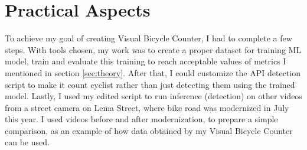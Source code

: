 \chapter{Practical Aspects}
\label{cha:practicalAspects}

To achieve my goal of creating Visual Bicycle Counter, I had to complete a few steps. With tools chosen, my work was to create a proper dataset for training ML model, train and evaluate this training to reach acceptable values of metrics I mentioned in section \ref{sec:theory}. After that, I could customize the API detection script to make it count cyclist rather than just detecting them using the trained model. Lastly, I used my edited script to run inference (detection) on other videos from a street camera on Lema Street, where bike road was modernized in July this year. I used videos before and after modernization, to prepare a simple comparison, as an example of how data obtained by my Visual Bicycle Counter can be used.

